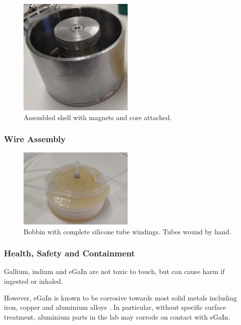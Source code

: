 \documentclass[a4paper,12pt]{article}
\begin{document}
\begin{figure}[h!]
	\centering
	\includegraphics[width=0.5\textwidth]{assembledshell.jpg}
	\caption{Assembled shell with magnets and core attached.}
	\label{fg:assembledshell}
\end{figure}

\subsubsection{Wire Assembly}
\begin{figure}[h!]
	\centering
	\includegraphics[width=0.5\textwidth]{assembledbobbin.jpg}
	\caption{Bobbin with complete silicone tube windings. Tubes wound by hand.}
	\label{fg:assembledbobbin}
\end{figure}

\subsubsection{Health, Safety and Containment}
Gallium, indium and eGaIn are not toxic to touch, but can cause harm if ingested or inhaled.

However, eGaIn is known to be corrosive towards most solid metals including iron, copper and aluminium alloys \cite{cuiLiquidMetalCorrosion2018}. In particular, without specific surface treatment, aluminium parts in the lab may corrode on contact with eGaIn.
\end{document}
